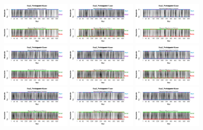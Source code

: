 \begin{figure}[th]
\includegraphics[width=0.30\textwidth]{Figures/BiasResp_Exp2_P10} \includegraphics[width=0.30\textwidth]{Figures/BiasResp_Exp2_P11} \includegraphics[width=0.30\textwidth]{Figures/BiasResp_Exp2_P12}
\includegraphics[width=0.30\textwidth]{Figures/BiasResp_Exp2_P13} \includegraphics[width=0.30\textwidth]{Figures/BiasResp_Exp2_P14} \includegraphics[width=0.30\textwidth]{Figures/BiasResp_Exp2_P15}
\includegraphics[width=0.30\textwidth]{Figures/BiasResp_Exp2_P16} \includegraphics[width=0.30\textwidth]{Figures/BiasResp_Exp2_P17} \includegraphics[width=0.30\textwidth]{Figures/BiasResp_Exp2_P18}

\end{figure}

